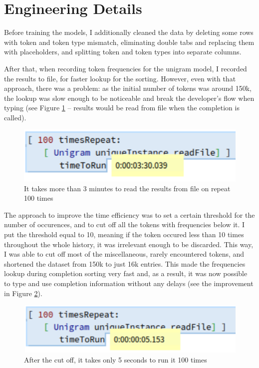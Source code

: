 \section{Engineering Details}
\label{sec:ProposedSolution-Engineering}
Before training the models, I additionally cleaned the data by deleting some rows with token and token type mismatch, eliminating double tabs and replacing them with placeholders, and splitting token and token types into separate columns.

After that, when recording token frequencies for the unigram model, I recorded the results to file, for faster lookup for the sorting. However, even with that approach, there was a problem: as the initial number of tokens was around 150k, the lookup was slow enough to be noticeable and break the developer's flow when typing (see Figure \ref{fig:sorterSlow} -- results would be read from file when the completion is called).

\begin{figure}[H]
    \centering
    \includegraphics[width=0.7\linewidth]{images/unigramTimeToRunSlow.png}
    \caption{It takes more than 3 minutes to read the results from file on repeat 100 times}
    \label{fig:sorterSlow}
\end{figure}

The approach to improve the time efficiency was to set a certain threshold for the number of occurences, and to cut off all the tokens with frequencies below it. I put the threshold equal to 10, meaning if the token occured less than 10 times throughout the whole history, it was irrelevant enough to be discarded. This way, I was able to cut off most of the miscellaneous, rarely encountered tokens, and shortened the dataset from 150k to just 16k entries. This made the frequencies lookup during completion sorting very fast and, as a result, it was now possible to type and use completion information without any delays (see the improvement in Figure \ref{fig:sorterFast}).

\begin{figure}[H]
    \centering
    \includegraphics[width=0.7\linewidth]{images/unigramTimeToRunFast.png}
    \caption{After the cut off, it takes only 5 seconds to run it 100 times}
    \label{fig:sorterFast}
\end{figure}

